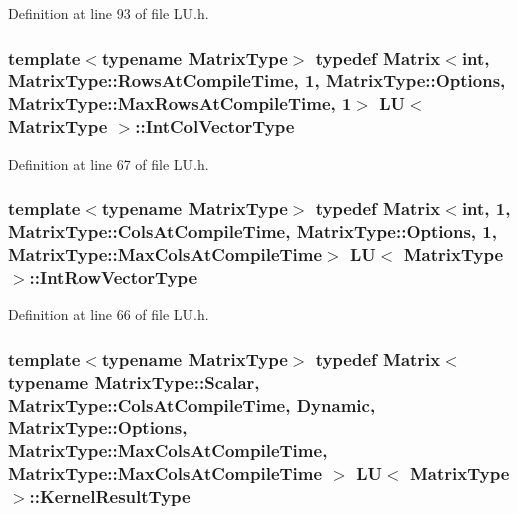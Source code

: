 Definition at line 93 of file L\-U.\-h.

\hypertarget{class_l_u_a830b9928b7aed0f3b0147dd0aa6b8f2e}{
\subsubsection[{Int\-Col\-Vector\-Type}]{\setlength{\rightskip}{0pt plus 5cm}template$<$typename Matrix\-Type$>$ typedef {\bf Matrix}$<${\bf int}, Matrix\-Type\-::\-Rows\-At\-Compile\-Time, 1, Matrix\-Type\-::\-Options, Matrix\-Type\-::\-Max\-Rows\-At\-Compile\-Time, 1$>$ {\bf L\-U}$<$ Matrix\-Type $>$\-::{\bf Int\-Col\-Vector\-Type}}}\label{class_l_u_a830b9928b7aed0f3b0147dd0aa6b8f2e}


Definition at line 67 of file L\-U.\-h.

\hypertarget{class_l_u_a8b1b7e093c9203820f5e557b9e0c4edf}{
\subsubsection[{Int\-Row\-Vector\-Type}]{\setlength{\rightskip}{0pt plus 5cm}template$<$typename Matrix\-Type$>$ typedef {\bf Matrix}$<${\bf int}, 1, Matrix\-Type\-::\-Cols\-At\-Compile\-Time, Matrix\-Type\-::\-Options, 1, Matrix\-Type\-::\-Max\-Cols\-At\-Compile\-Time$>$ {\bf L\-U}$<$ Matrix\-Type $>$\-::{\bf Int\-Row\-Vector\-Type}}}\label{class_l_u_a8b1b7e093c9203820f5e557b9e0c4edf}


Definition at line 66 of file L\-U.\-h.

\hypertarget{class_l_u_a54c6b7bc8df14bc6d50249256a996e6f}{
\subsubsection[{Kernel\-Result\-Type}]{\setlength{\rightskip}{0pt plus 5cm}template$<$typename Matrix\-Type$>$ typedef {\bf Matrix}$<$typename Matrix\-Type\-::\-Scalar, Matrix\-Type\-::\-Cols\-At\-Compile\-Time, {\bf Dynamic}, Matrix\-Type\-::\-Options, Matrix\-Type\-::\-Max\-Cols\-At\-Compile\-Time, Matrix\-Type\-::\-Max\-Cols\-At\-Compile\-Time $>$ {\bf L\-U}$<$ Matrix\-Type $>$\-::{\bf Kernel\-Result\-Type}}}\label{class_l_u_a54c6b7bc8df14bc6d50249256a996e6f}


